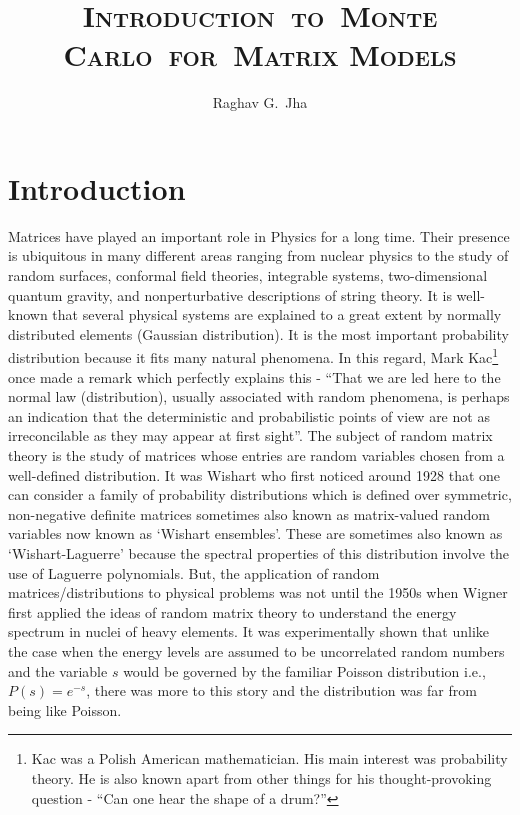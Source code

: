 \documentclass[letter,11pt]{article}
\title{\textsc{\LARGE{Introduction}~\large{to}~\LARGE{Monte Carlo}~\large{for}~\LARGE{Matrix Models}}}
\author[a]{Raghav G.~Jha}
\affiliation{Perimeter Institute for Theoretical Physics, Waterloo, Ontario N2L 2Y5, Canada}
\begin{document}
\date{}
\maketitle

\section{Introduction}

Matrices have played an important role in Physics for a long time. Their presence is ubiquitous in many different areas ranging from nuclear physics to the study of random surfaces, 
conformal field theories, integrable systems, two-dimensional quantum gravity, and nonperturbative descriptions of string theory. It is well-known that several physical systems are explained to a great extent by normally distributed elements (Gaussian distribution). It is the most important probability 
distribution because it fits many natural phenomena.  In this regard, Mark Kac\footnote{Kac was a Polish American mathematician. His main interest was probability theory. He is also known apart from other things for his thought-provoking question - ``Can one hear 
the shape of a drum?''} once made a remark which perfectly explains this - ``That we are led here to the normal law (distribution), usually associated with random phenomena, is perhaps
an indication that the deterministic and probabilistic points of view are not as irreconcilable as they may appear at first sight''. The subject of random matrix theory is the study of matrices whose entries are random variables chosen from a well-defined distribution. It was Wishart who first
noticed around 1928 that one can consider a family of 
probability distributions which is defined over symmetric, non-negative definite 
matrices sometimes also known as matrix-valued random variables 
now known as `Wishart ensembles'. These are sometimes also known 
as `Wishart-Laguerre' because the spectral properties of this distribution 
involve the use of Laguerre polynomials. But, the application of random matrices/distributions
to physical problems was not until the 1950s
when Wigner first applied the ideas of random matrix theory 
to understand the energy spectrum in nuclei of heavy elements. It was experimentally 
shown that unlike the case when the energy levels are assumed to be uncorrelated
random numbers and the variable $s$ would be governed by the familiar Poisson distribution 
i.e., $P(s) = e^{-s}$, there was more to this story and the distribution was far from being like Poisson. 
\end{document}
